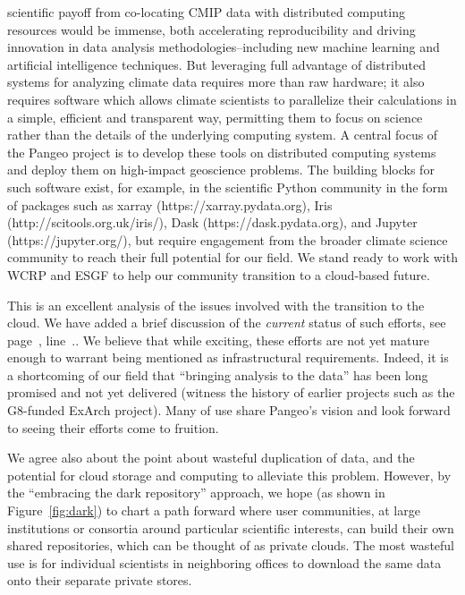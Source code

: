 \documentclass[gmd,manuscript]{copernicus}
\newcommand{\plref}[1]{see page~\pageref{p-#1}, line~\lineref{l-#1}.}
\newenvironment{answer}{\color{blue}}{}
\begin{document}
\begin{enumerate}[label=SC1-\arabic*,leftmargin=*]
  scientific payoff from co-locating CMIP data with distributed
  computing resources would be immense, both accelerating
  reproducibility and driving innovation in data analysis
  methodologies--including new machine learning and artificial
  intelligence techniques. But leveraging full advantage of
  distributed systems for analyzing climate data requires more than
  raw hardware; it also requires software which allows climate
  scientists to parallelize their calculations in a simple, efficient
  and transparent way, permitting them to focus on science rather than
  the details of the underlying computing system. A central focus of
  the Pangeo project is to develop these tools on distributed
  computing systems and deploy them on high-impact geoscience
  problems. The building blocks for such software exist, for example,
  in the scientific Python community in the form of packages such as
  xarray (https://xarray.pydata.org), Iris
  (http://scitools.org.uk/iris/), Dask (https://dask.pydata.org), and
  Jupyter (https://jupyter.org/), but require engagement from the
  broader climate science community to reach their full potential for
  our field. We stand ready to work with WCRP and ESGF to help our
  community transition to a cloud-based future.
\end{enumerate}

\begin{answer}
  This is an excellent analysis of the issues involved with the
  transition to the cloud. We have added a brief discussion of the
  \emph{current} status of such efforts, \plref{SC1-1}. We believe
  that while exciting, these efforts are not yet mature enough to
  warrant being mentioned as infrastructural requirements. Indeed, it
  is a shortcoming of our field that ``bringing analysis to the data''
  has been long promised and not yet delivered (witness the history of
  earlier projects such as the G8-funded ExArch project). Many
  of use share Pangeo's vision and look forward to seeing their
  efforts come to fruition.

  We agree also about the point about wasteful duplication of data,
  and the potential for cloud storage and computing to alleviate this
  problem. However, by the ``embracing the dark repository'' approach,
  we hope (as shown in Figure~\ref{fig:dark}) to chart a path
  forward where user communities, at large institutions or consortia
  around particular scientific interests, can build their own shared
  repositories, which can be thought of as private clouds. The most
  wasteful use is for individual scientists in neighboring offices to
  download the same data onto their separate private stores.
\end{answer}
\end{document}
